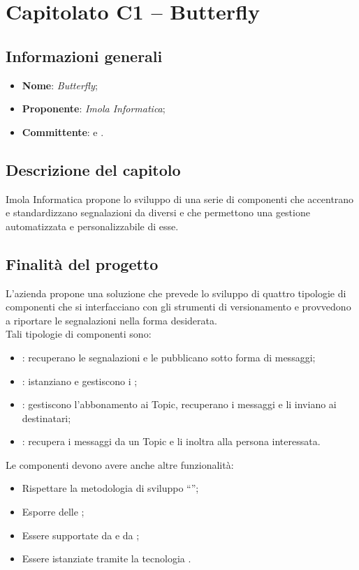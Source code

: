 \section{Capitolato C1 – Butterfly}

\subsection{Informazioni generali}

\begin{itemize}
\item \textbf{Nome}: \textit{Butterfly};\phantom{.}
\item \textbf{Proponente}: \textit{Imola Informatica};\phantom{.}
\item \textbf{Committente}: \commitNameM\mbox{} e \commitNameS.
\end{itemize}

\subsection{Descrizione del capitolo}
Imola Informatica propone lo sviluppo di una serie di componenti che accentrano e standardizzano segnalazioni da diversi  e che 
permettono una gestione automatizzata e personalizzabile di esse.

\subsection{Finalità del progetto}

L’azienda propone una soluzione che prevede lo sviluppo di quattro tipologie di componenti che si interfacciano con gli strumenti di versionamento e provvedono a riportare le segnalazioni nella forma desiderata.
\\
Tali tipologie di componenti sono:
\begin{itemize}
    \item \textbf{}:  recuperano le segnalazioni e le pubblicano sotto forma di messaggi;
    \item \textbf{}: istanziano e gestiscono i ;
    \item \textbf{}: gestiscono l'abbonamento ai Topic, recuperano i messaggi e li inviano ai destinatari;
    \item \textbf{}: recupera i messaggi da un Topic e li inoltra alla persona interessata.

\end{itemize}
\item Le componenti devono avere anche altre funzionalità:
\begin{itemize}
    \item Rispettare la metodologia di sviluppo “”;
    \item Esporre delle ;
    \item Essere supportate da  e da ;
    \item Essere istanziate tramite la tecnologia .
    
\end{itemize}

